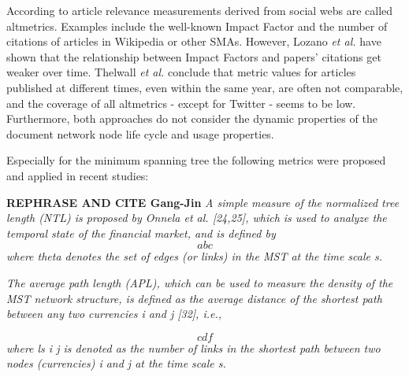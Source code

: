 \documentclass[a4paper,10pt]{scrbook}
\begin{document}
According to \cite{10.1371/journal.pone.0064841} article relevance measurements
derived from social webs are called altmetrics. Examples include the well-known
Impact Factor and the number of citations of articles in
Wikipedia or other SMAs. However, Lozano {\it et al.} \cite{LOZANO} have shown
that the relationship between Impact Factors and papers' citations get weaker
over time.  Thelwall {\it et al.} \cite{10.1371/journal.pone.0064841} conclude
that metric values for articles published at different times, even within the
same year, are often not comparable, and the coverage of all altmetrics - except
for Twitter - seems to be low. Furthermore, both approaches do not consider the
dynamic properties of the document network node life cycle and usage properties.



%
%
%
%
%
%





Especially for the minimum spanning tree the following metrics were proposed and applied in recent studies:

\textbf{REPHRASE AND CITE Gang-Jin
}
\textit{A simple measure of the normalized tree length (NTL) is proposed by Onnela et al. [24,25],
which is used to analyze the temporal state of the financial market, and is defined by}
\begin{equation}
abc
\end{equation}
\textit{where theta denotes the set of edges (or links) in the MST at the time scale s.
}

\textit{The average path length (APL), which can be used to measure the density of the MST network
structure, is defined as the average distance of the shortest path between any two currencies
i and j [32], i.e.,}

\begin{equation}
cdf
\end{equation}
\textit{where ls
i j is denoted as the number of links in the shortest path between two nodes (currencies) i and j at
the time scale s.
}
\end{document}
